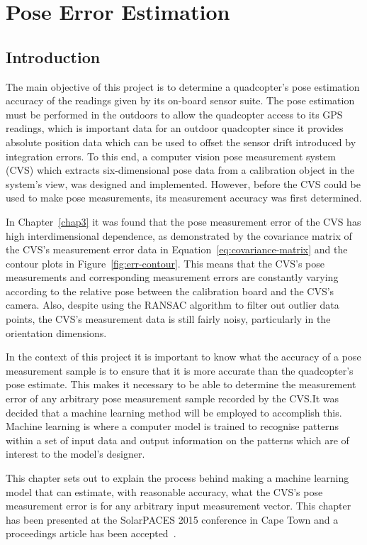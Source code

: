\chapter{Pose Error Estimation}
\label{chap4}

\section{Introduction}

The main objective of this project is to determine a quadcopter's pose estimation accuracy of the readings given by its on-board sensor suite. The pose estimation must be performed in the outdoors to allow the quadcopter access to its GPS readings, which is important data for an outdoor quadcopter since it provides absolute position data which can be used to offset the sensor drift introduced by integration errors. To this end, a computer vision pose measurement system (CVS) which extracts six-dimensional pose data from a calibration object in the system's view, was designed and implemented. However, before the CVS could be used to make pose measurements, its measurement accuracy was first determined. 

In Chapter~\ref{chap3} it was found that the pose measurement error of the CVS has high interdimensional dependence, as demonstrated by the covariance matrix of the CVS's measurement error data in Equation~\ref{eq:covariance-matrix} and the contour plots in Figure~\ref{fig:err-contour}. This means that the CVS's pose measurements and corresponding measurement errors are constantly varying according to the relative pose between the calibration board and the CVS's camera. Also, despite using the RANSAC algorithm to filter out outlier data points, the CVS's measurement data is still fairly noisy, particularly in the orientation dimensions.

In the context of this project it is important to know what the accuracy of a pose measurement sample is to ensure that it is more accurate than the quadcopter's pose estimate. This makes it necessary to be able to determine the measurement error of any arbitrary pose measurement sample recorded by the CVS.\@ It was decided that a machine learning method will be employed to accomplish this. Machine learning is where a computer model is trained to recognise patterns within a set of input data and output information on the patterns which are of interest to the model's designer. 

This chapter sets out to explain the process behind making a machine learning model that can estimate, with reasonable accuracy, what the CVS's pose measurement error is for any arbitrary input measurement vector. This chapter has been presented at the SolarPACES 2015 conference in Cape Town and a proceedings article has been accepted~\citep{lock2015}. 

